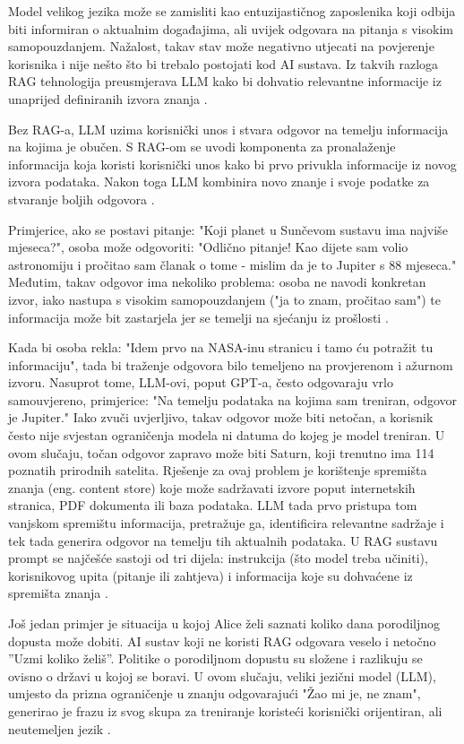 \documentclass[]{foi}
\begin{document}
Model velikog jezika može se zamisliti kao entuzijastičnog zaposlenika koji odbija biti informiran o aktualnim događajima, ali uvijek odgovara
na pitanja s visokim samopouzdanjem. Nažalost, takav stav može negativno utjecati na povjerenje korisnika i nije nešto što bi trebalo postojati
kod AI sustava. Iz takvih razloga RAG tehnologija preusmjerava LLM kako bi dohvatio relevantne informacije iz unaprijed definiranih izvora znanja \cite{awsRAG2025}.

Bez RAG-a, LLM uzima korisnički unos i stvara odgovor na temelju informacija na kojima je obučen. S RAG-om se uvodi komponenta za pronalaženje 
informacija koja koristi korisnički unos kako bi prvo privukla informacije iz novog izvora podataka. Nakon toga LLM kombinira novo znanje i svoje 
podatke za stvaranje boljih odgovora \cite{awsRAG2025}.

Primjerice, ako se postavi pitanje: "Koji planet u Sunčevom sustavu ima najviše mjeseca?", osoba može odgovoriti: "Odlično pitanje! Kao dijete sam volio astronomiju i pročitao sam članak o tome
- mislim da je to Jupiter s 88 mjeseca." Međutim, takav odgovor ima nekoliko problema: osoba ne navodi konkretan izvor, iako nastupa s visokim samopouzdanjem ("ja to znam, pročitao sam")
te informacija može bit zastarjela jer se temelji na sjećanju iz prošlosti \cite{ibm2023rag}.

Kada bi osoba rekla: "Idem prvo na NASA-inu stranicu i tamo ću potražit tu informaciju", tada bi traženje odgovora bilo temeljeno na provjerenom i ažurnom izvoru.
Nasuprot tome, LLM-ovi, poput GPT-a, često odgovaraju vrlo samouvjereno, primjerice: "Na temelju podataka na kojima sam treniran, odgovor je Jupiter."
Iako zvuči uvjerljivo, takav odgovor može biti netočan, a korisnik često nije svjestan ograničenja modela ni datuma do kojeg je model treniran. U ovom slučaju, točan odgovor 
zapravo može biti Saturn, koji trenutno ima 114 poznatih prirodnih satelita. Rješenje za ovaj problem je korištenje spremišta znanja (eng. content store) koje može sadržavati izvore poput
internetskih stranica, PDF dokumenta ili baza podataka. LLM tada prvo pristupa tom vanjskom spremištu informacija, pretražuje ga, identificira relevantne sadržaje i tek tada generira
odgovor na temelju tih aktualnih podataka. U RAG sustavu prompt se najčešće sastoji od tri dijela: instrukcija (što model treba učiniti), korisnikovog upita (pitanje ili zahtjeva) i informacija 
koje su dohvaćene iz spremišta znanja \cite{ibm2023rag}.

Još jedan primjer je situacija u kojoj Alice želi saznati koliko dana porodiljnog dopusta može dobiti. AI sustav koji ne koristi RAG odgovara veselo i netočno ”Uzmi koliko želiš”.
Politike o porodiljnom dopustu su složene i razlikuju se ovisno o državi u kojoj se boravi. U ovom slučaju, veliki jezični model (LLM), umjesto da prizna ograničenje u znanju odgovarajući
"Žao mi je, ne znam", generirao je frazu iz svog skupa za treniranje koristeći korisnički orijentiran, ali neutemeljen jezik \cite{ibmRAG}.
\end{document}
